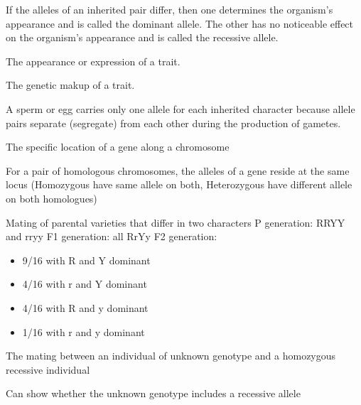 If the alleles of an inherited pair differ, then one determines the organism's appearance and is called the dominant allele. The other has no noticeable effect on the organism's appearance and is called the recessive allele.


\newcommand{\phenotypedef}{The appearance or expression of a trait.}
\begin{definition}[Phenotype] \label{definition:phenotype}
    \phenotypedef
\end{definition}

\newcommand{\genotypedef}{The genetic makup of a trait.}
\begin{definition}[Genotype] \label{definition:genotype}
    \genotypedef
\end{definition}

\newcommand{\lawofsegdef}{A sperm or egg carries only one allele for each inherited character because allele pairs separate (segregate) from each other during the production of gametes.}
\begin{definition} \label{definition:lawofseg}
    \lawofsegdef
\end{definition}

\newcommand{\locusdef}{The specific location of a gene along a chromosome}
\begin{definition}[locus] \label{definition:locus}
    \locusdef

    For a pair of homologous chromosomes, the alleles of a gene reside at the same locus (Homozygous have same allele on both, Heterozygous have different allele on both homologues)
\end{definition}

\newcommand{\dihybriddef}{Mating of parental varieties that differ in two characters}
\begin{definition} \label{definition:dihybrid}
    \dihybriddef
    P generation: RRYY and rryy
    F1 generation: all RrYy
    F2 generation:
    \begin{itemize}
        \item 9/16 with R and Y dominant
        \item 4/16 with r and Y dominant
        \item 4/16 with R and y dominant
        \item 1/16 with r and y dominant
    \end{itemize}
\end{definition}

\newcommand{\testcrossdef}{The mating between an individual of unknown genotype and a homozygous recessive individual}
\begin{definition}[Testcross] \label{definition:testcross}
    \testcrossdef

    Can show whether the unknown genotype includes a recessive allele
\end{definition}